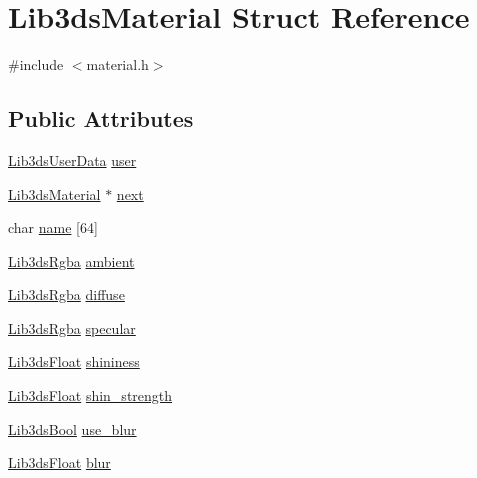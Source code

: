 \hypertarget{struct_lib3ds_material}{\section{Lib3ds\-Material Struct Reference}
\label{struct_lib3ds_material}
}


{\ttfamily \#include $<$material.\-h$>$}

\subsection*{Public Attributes}
\begin{DoxyCompactItemize}
\item 
\hyperlink{union_lib3ds_user_data}{Lib3ds\-User\-Data} \hyperlink{struct_lib3ds_material_acb1af2486f89d23df922a1c63d257a70}{user}
\item 
\hyperlink{struct_lib3ds_material}{Lib3ds\-Material} $\ast$ \hyperlink{struct_lib3ds_material_a8fa619b56709cf7db85f57efee5af3ae}{next}
\item 
char \hyperlink{struct_lib3ds_material_a642032ce784f98df514d26e58ce63282}{name} \mbox{[}64\mbox{]}
\item 
\hyperlink{types_8h_ac89f84af1bc3ce24f4c66b84d43022c0}{Lib3ds\-Rgba} \hyperlink{struct_lib3ds_material_a72517b7792273904404d598ef6b9c07d}{ambient}
\item 
\hyperlink{types_8h_ac89f84af1bc3ce24f4c66b84d43022c0}{Lib3ds\-Rgba} \hyperlink{struct_lib3ds_material_abefbe1a6379b99e883185c02c611d6e5}{diffuse}
\item 
\hyperlink{types_8h_ac89f84af1bc3ce24f4c66b84d43022c0}{Lib3ds\-Rgba} \hyperlink{struct_lib3ds_material_a26df3a7fb91805a9a424dfdb850f02fd}{specular}
\item 
\hyperlink{types_8h_ab18e70f51f9a53c9dee8d930c8e1a7bf}{Lib3ds\-Float} \hyperlink{struct_lib3ds_material_aea6993782a5182e1f4abfc7940e57213}{shininess}
\item 
\hyperlink{types_8h_ab18e70f51f9a53c9dee8d930c8e1a7bf}{Lib3ds\-Float} \hyperlink{struct_lib3ds_material_a0c0e5bd539d2014c445fd7f3876a762d}{shin\-\_\-strength}
\item 
\hyperlink{types_8h_a89dd7398a9ebbbf28011f8c32df67ad3}{Lib3ds\-Bool} \hyperlink{struct_lib3ds_material_a3a6a241b3becb93fc041b452f780c860}{use\-\_\-blur}
\item 
\hyperlink{types_8h_ab18e70f51f9a53c9dee8d930c8e1a7bf}{Lib3ds\-Float} \hyperlink{struct_lib3ds_material_a89772e8db2026d0151db6246f7416a31}{blur}
\item 

\end{DoxyCompactItemize}
